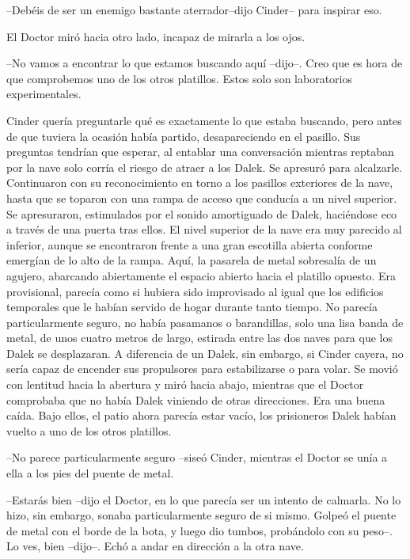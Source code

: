 --Debéis de ser un enemigo bastante aterrador--dijo Cinder-- para inspirar eso.

El Doctor miró hacia otro lado, incapaz de mirarla a los ojos. 

--No vamos a encontrar lo que estamos buscando aquí --dijo--. Creo que es hora de que comprobemos uno de los otros platillos. Estos solo son laboratorios experimentales.

Cinder quería preguntarle qué es exactamente lo que estaba buscando, pero antes de que tuviera la ocasión había partido, desapareciendo en el pasillo. Sus preguntas tendrían que esperar, al entablar una conversación mientras reptaban por la nave solo corría el riesgo de atraer a los Dalek. Se apresuró para alcalzarle.
Continuaron con su reconocimiento en torno a los pasillos exteriores de la nave, hasta que se toparon con una rampa de acceso que conducía a un nivel superior. Se apresuraron, estimulados por el sonido amortiguado de Dalek, haciéndose eco a través de una puerta tras ellos.
El nivel superior de la nave era muy parecido al inferior, aunque se encontraron frente a una gran escotilla abierta conforme emergían de lo alto de la rampa. Aquí, la pasarela de metal sobresalía de un agujero, abarcando abiertamente el espacio abierto hacia el platillo opuesto.
Era provisional, parecía como si hubiera sido improvisado al igual que los edificios temporales que le habían servido de hogar durante tanto tiempo. No parecía particularmente seguro, no había pasamanos o barandillas, solo una lisa banda de metal, de unos cuatro metros de largo, estirada entre las dos naves para que los Dalek se desplazaran. A diferencia de un Dalek, sin embargo, si Cinder cayera, no sería capaz de encender sus propulsores para estabilizarse o para volar.
Se movió con lentitud hacia la abertura y miró hacia abajo, mientras que el Doctor comprobaba que no había Dalek viniendo de otras direcciones. Era una buena caída. Bajo ellos, el patio ahora parecía estar vacío, los prisioneros Dalek habían vuelto a uno de los otros platillos.

--No parece particularmente seguro --siseó Cinder, mientras el Doctor se unía a ella a los pies del puente de metal.

--Estarás bien --dijo el Doctor, en lo que parecía ser un intento de calmarla. No lo hizo, sin embargo, sonaba particularmente seguro de si mismo. Golpeó el puente de metal con el borde de la bota, y luego dio tumbos, probándolo con su peso--. Lo ves, bien --dijo--. Echó a andar en dirección a la otra nave.

